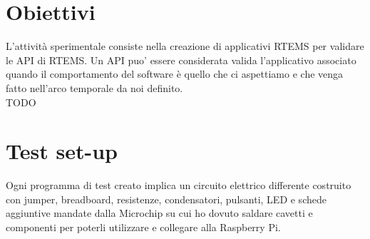 \documentclass[12pt, a4paper, titlepage, oneside]{book}
\begin{document}
\begin{flushleft}
\section{Obiettivi}
L'attività sperimentale consiste nella creazione di applicativi RTEMS per validare le API di RTEMS. Un API puo' essere considerata valida l'applicativo associato quando il comportamento del software è quello che ci aspettiamo e che venga fatto nell'arco temporale da noi definito.\\
TODO

\section{Test set-up}
Ogni programma di test creato implica un circuito elettrico differente costruito con jumper, breadboard, resistenze, condensatori, pulsanti, LED e schede aggiuntive mandate dalla Microchip su cui ho dovuto saldare cavetti e componenti per poterli utilizzare e collegare alla Raspberry Pi.\\


\end{flushleft}
\end{document}
